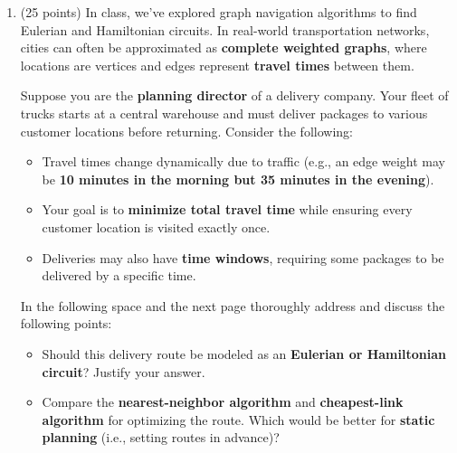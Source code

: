 \documentclass[12pt]{exam}
\begin{document}
\begin{enumerate}
\iffalse
Sol:
\begin{enumerate}
    \item A walk starts and ends at different places whereas a circuit begins and ends at the same place.
    \item Eulerian means that edges are the object of interest to traverse, while Hamiltonian means that the vertices are the traversed ones.
    \item Any path graph.
    \item A path graph with any pair of middle vertices connected.
    \item Two triangles joined at a vertex, say a ribbon.
    \item The ribbon graph again.
    \item A cycle with more than four vertices with any two non-adjacent vertices connected.
\end{enumerate}
\fi
\newpage
\item (25 points) In class, we've explored graph navigation algorithms to find Eulerian and Hamiltonian circuits. In real-world transportation networks, cities can often be approximated as \textbf{complete weighted graphs}, where locations are vertices and edges represent \textbf{travel times} between them.\par
Suppose you are the \textbf{planning director} of a delivery company. Your fleet of trucks starts at a central warehouse and must deliver packages to various customer locations before returning. Consider the following:  
\begin{itemize}
    \item Travel times change dynamically due to traffic (e.g., an edge weight may be \textbf{10 minutes in the morning but 35 minutes in the evening}).  
    \item Your goal is to \textbf{minimize total travel time} while ensuring every customer location is visited exactly once.  
    \item Deliveries may also have \textbf{time windows}, requiring some packages to be delivered by a specific time.  
\end{itemize}
In the following space and the next page thoroughly address and discuss the following points:
\begin{itemize}
    \item Should this delivery route be modeled as an \textbf{Eulerian or Hamiltonian circuit}? Justify your answer.  
    \item Compare the \textbf{nearest-neighbor algorithm} and \textbf{cheapest-link algorithm} for optimizing the route. Which would be better for \textbf{static planning} (i.e., setting routes in advance)?  

\end{itemize}
\end{enumerate}
\end{document}
